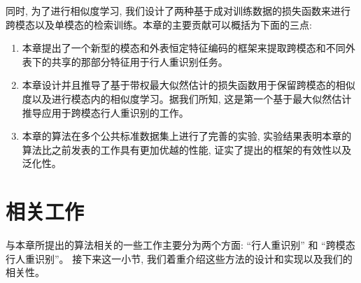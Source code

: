 同时, 为了进行相似度学习, 我们设计了两种基于成对训练数据的损失函数来进行跨模态以及单模态的检索训练。本章的主要贡献可以概括为下面的三点:
\begin{enumerate}
    \item 本章提出了一个新型的模态和外表恒定特征编码的框架来提取跨模态和不同外表下的共享的那部分特征用于行人重识别任务。
    \item 本章设计并且推导了基于带权最大似然估计的损失函数用于保留跨模态的相似度以及进行模态内的相似度学习。据我们所知, 这是第一个基于最大似然估计推导应用于跨模态行人重识别的工作。
    \item 本章的算法在多个公共标准数据集上进行了完善的实验, 实验结果表明本章的算法比之前发表的工作具有更加优越的性能, 证实了提出的框架的有效性以及泛化性。
\end{enumerate}

\section{相关工作}
与本章所提出的算法相关的一些工作主要分为两个方面: ``行人重识别'' 和 ``跨模态行人重识别''。 接下来这一小节, 我们着重介绍这些方法的设计和实现以及我们的相关性。
